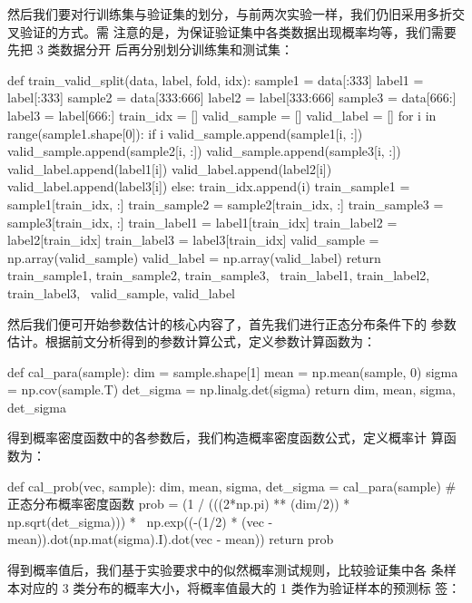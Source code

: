 \documentclass[UTF8,a4paper,10pt]{ctexart}
\begin{document}
然后我们要对行训练集与验证集的划分，与前两次实验一样，我们仍旧采用多折交叉验证的方式。需
注意的是，为保证验证集中各类数据出现概率均等，我们需要先把 3 类数据分开
后再分别划分训练集和测试集：

\begin{python}
   def train_valid_split(data, label, fold, idx):
    sample1 = data[:333]
    label1 = label[:333]
    sample2 = data[333:666]
    label2 = label[333:666]
    sample3 = data[666:]
    label3 = label[666:]
    train_idx = []
    valid_sample = []
    valid_label = []
    for i in range(sample1.shape[0]):
        if i%
            valid_sample.append(sample1[i, :])
            valid_sample.append(sample2[i, :])
            valid_sample.append(sample3[i, :])
            valid_label.append(label1[i])
            valid_label.append(label2[i])
            valid_label.append(label3[i])
        else:
            train_idx.append(i)
    train_sample1 = sample1[train_idx, :]
    train_sample2 = sample2[train_idx, :]
    train_sample3 = sample3[train_idx, :]
    train_label1 = label1[train_idx]
    train_label2 = label2[train_idx]
    train_label3 = label3[train_idx]
    valid_sample = np.array(valid_sample)
    valid_label = np.array(valid_label)
    return train_sample1, train_sample2, train_sample3, \
           train_label1, train_label2, train_label3, \
           valid_sample, valid_label
\end{python}

然后我们便可开始参数估计的核心内容了，首先我们进行正态分布条件下的
参数估计。根据前文分析得到的参数计算公式，定义参数计算函数为：

\begin{python}
   def cal_para(sample):
    dim = sample.shape[1]
    mean = np.mean(sample, 0)
    sigma = np.cov(sample.T)
    det_sigma = np.linalg.det(sigma)
    return dim, mean, sigma, det_sigma
\end{python}

得到概率密度函数中的各参数后，我们构造概率密度函数公式，定义概率计
算函数为：

\begin{python}
   def cal_prob(vec, sample):
    dim, mean, sigma, det_sigma = cal_para(sample)
    # 正态分布概率密度函数
    prob = (1 / (((2*np.pi) ** (dim/2)) * np.sqrt(det_sigma))) * \
           np.exp((-(1/2) * (vec - mean)).dot(np.mat(sigma).I).dot(vec - mean))
    return prob
\end{python}

得到概率值后，我们基于实验要求中的似然概率测试规则，比较验证集中各
条样本对应的 3 类分布的概率大小，将概率值最大的 1 类作为验证样本的预测标
签：
\end{document}
